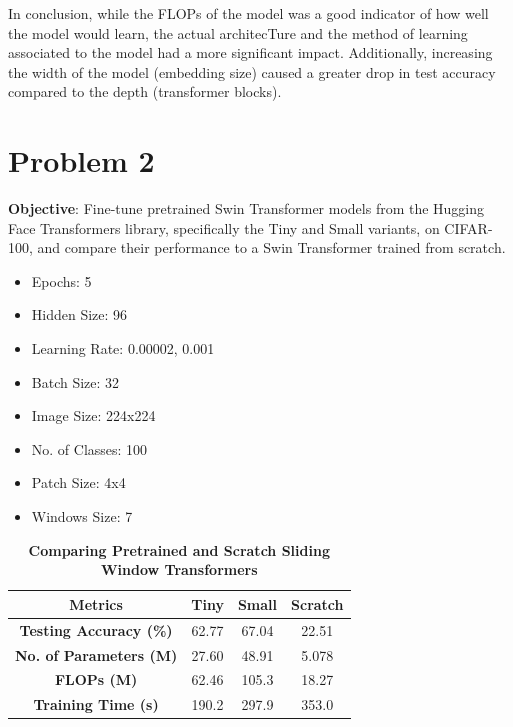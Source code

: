 \documentclass[a4paper]{article}
\begin{document}
In conclusion, while the FLOPs of the model was a good indicator of how well the model would learn, the actual architecTure and the method of learning associated to the model had a more significant impact. Additionally, increasing the width of the model (embedding size) caused a greater drop in test accuracy compared to the depth (transformer blocks).

\section*{\textbf{Problem 2}}
\textbf{Objective}: Fine-tune pretrained Swin Transformer models from the Hugging Face Transformers library, specifically the Tiny and Small variants, on CIFAR-100, and compare their performance to a Swin Transformer trained from scratch.

\begin{itemize}
    \item Epochs: 5
    \item Hidden Size: 96
    \item Learning Rate: 0.00002, 0.001
    \item Batch Size: 32
    \item Image Size: 224x224
    \item No. of Classes: 100
    \item Patch Size: 4x4
    \item Windows Size: 7
\end{itemize}

\begin{table}[H]
    \centering
    \caption{\textbf{Comparing Pretrained and Scratch Sliding Window Transformers}}
    \label{tab:swinComp}
    \begin{tabular}{| c || c | c | c |}
        \hline
        \textbf{Metrics}               & \textbf{Tiny} & \textbf{Small} & \textbf{Scratch} \\
        \hline
        \textbf{Testing Accuracy (\%)} &     62.77     &     67.04      &       22.51      \\
        \hline
        \textbf{No. of Parameters (M)} &     27.60     &     48.91      &       5.078      \\
        \hline
        \textbf{FLOPs (M)}             &     62.46     &     105.3      &       18.27      \\
        \hline
        \textbf{Training Time (s)}     &     190.2     &     297.9      &       353.0      \\
        \hline
    \end{tabular}
\end{table}
\end{document}
